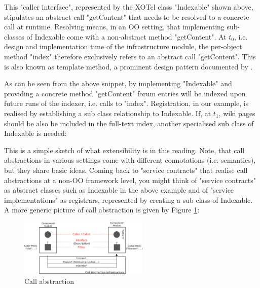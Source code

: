 %

%
This "caller interface", represented by the XOTcl class "Indexable" shown above, stipulates an abstract call "getContent" that needs to be resolved to a concrete call at runtime. Resolving means, in an OO setting, that implementing sub-classes of Indexable come with a non-abstract method "getContent". At \begin{math}t_0\end{math}, i.e. design and implementation time of the infrastructure module, the per-object method "index" therefore exclusively refers to an abstract call "getContent". This is also known as template method, a prominent design pattern documented by \cite{gof:1994}.
%

%
As can be seen from the above snippet, by implementing "Indexable" and providing a concrete method "getContent" forum entries will be indexed upon future runs of the indexer, i.e. calls to "index". Registration, in our example, is realised by establishing a sub class relationship to Indexable. If, at \begin{math}t_1\end{math}, wiki pages should be also be included in the full-text index, another specialised sub class of Indexable is needed:
%

%
This is a simple sketch of what extensibility is in this reading. Note, that call abstractions in various settings come with different connotations (i.e. semantics), but they share basic ideas. Coming back to "service contracts" that realise call abstractions at a non-OO framework level, you might think of "service contracts" as abstract classes such as Indexable in the above example and of "service implementations" as registrars, represented by creating a sub class of Indexable. A more generic picture of call abstraction is given by Figure \ref{fig:advanced:ca:1}: 
  \begin{figure}[htbp]
\begin{center}
\includegraphics[width=0.55\textwidth]{img/call-abstraction-scheme.png}
\caption{Call abstraction}
\label{fig:advanced:ca:1}
\end{center}
\end{figure}
